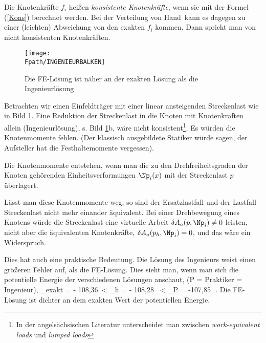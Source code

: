 Die Knotenkr\"{a}fte $f_i$ hei{\ss}en {\em konsistente Knotenkr\"{a}fte\/}, wenn sie mit der Formel
(\ref{Kons}) berechnet werden. Bei der \hlq Verteilung von Hand\grq\, kann es dagegen zu
einer (leichten) Abweichung von den exakten $f_i$ kommen. Dann spricht man von nicht
konsistenten Knotenkr\"{a}ften.

\begin{figure}[tbp]
\if {} \sidecaption \fi
\texttt{[image: \\Fpath/INGENIEURBALKEN]}
\caption{Die FE-L\"{o}sung ist n\"{a}her an der exakten L\"{o}sung als die Ingenieurl\"{o}sung}
\label{Ingenieurbalken}
\end{figure}%

Betrachten wir einen Einfeldtr\"{a}ger mit einer linear ansteigenden Streckenlast wie in
Bild \ref{Ingenieurbalken}. Eine Reduktion der Streckenlast in die Knoten mit
Knotenkr\"{a}ften allein (\hlq Ingen\-ieur\-l\"{o}\-sung\grq), s. Bild \ref{Ingenieurbalken}b,
w\"{a}re nicht konsistent\footnote{In der angels\"{a}chsischen Literatur unterscheidet man
zwischen {\em work-equivalent loads \/} und {\em lumped loads\/}}. Es w\"{u}rden die
Knotenmomente fehlen. (Der klassisch ausgebildete Statiker w\"{u}rde sagen, der Aufsteller
hat die Festhaltemomente vergessen).

Die Knotenmomente entstehen, wenn man die zu den Drehfreiheitsgraden der Knoten
geh\"{o}renden Einheitsverformungen $\Np_i(x)$ mit der Streckenlast $p$ \"{u}berlagert.

L\"{a}sst man diese Knotenmomente weg, so sind der Ersatzlastfall und der Lastfall
Streckenlast nicht mehr einander \"{a}quivalent. Bei einer Drehbewegung eines Knotens w\"{u}rde
die Streckenlast eine virtuelle Arbeit $\delta A_a(p,\Np_i) \neq 0$ leisten, nicht aber
die \"{a}quivalenten Knotenkr\"{a}fte, $\delta A_a(p_{h},\Np_i) =  0$,  und das w\"{a}re ein
Widerspruch.

Dies hat auch eine praktische Bedeutung. Die L\"{o}sung des Ingenieurs weist einen gr\"{o}{\ss}eren
Fehler auf, als die FE-L\"{o}sung. Dies sieht man, wenn man sich die potentielle Energie der
verschiedenen L\"{o}sungen anschaut, (P = Praktiker = Ingenieur),
\bfoo
\Pi_{exakt} = - 108,36\,   <  \Pi_{h} = - 108,28 \, <  \Pi_{P} =
-107,85 \,\,.
\efoo
Die FE-L\"{o}sung ist dichter an dem exakten Wert der potentiellen Energie.

